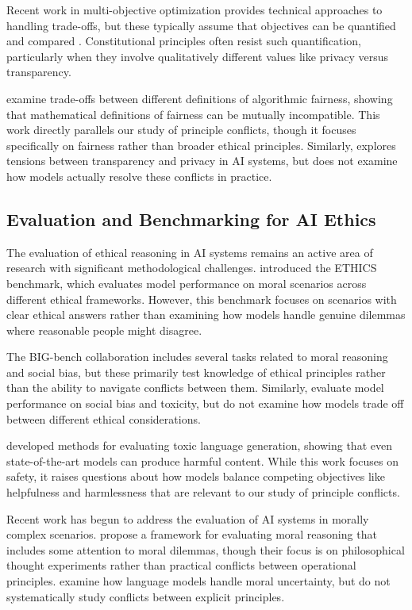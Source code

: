 \documentclass[11pt,a4paper]{article}
\begin{document}
Recent work in multi-objective optimization provides technical approaches to handling trade-offs, but these typically assume that objectives can be quantified and compared \citep{deb2001multi, zhang2007moea}. Constitutional principles often resist such quantification, particularly when they involve qualitatively different values like privacy versus transparency.

\citet{barocas2017fairness} examine trade-offs between different definitions of algorithmic fairness, showing that mathematical definitions of fairness can be mutually incompatible. This work directly parallels our study of principle conflicts, though it focuses specifically on fairness rather than broader ethical principles. Similarly, \citet{mitchell2021algorithmic} explores tensions between transparency and privacy in AI systems, but does not examine how models actually resolve these conflicts in practice.

\subsection{Evaluation and Benchmarking for AI Ethics}

The evaluation of ethical reasoning in AI systems remains an active area of research with significant methodological challenges. \citet{hendrycks2020measuring} introduced the ETHICS benchmark, which evaluates model performance on moral scenarios across different ethical frameworks. However, this benchmark focuses on scenarios with clear ethical answers rather than examining how models handle genuine dilemmas where reasonable people might disagree.

The BIG-bench collaboration \citep{srivastava2022beyond} includes several tasks related to moral reasoning and social bias, but these primarily test knowledge of ethical principles rather than the ability to navigate conflicts between them. Similarly, \citet{rae2021scaling} evaluate model performance on social bias and toxicity, but do not examine how models trade off between different ethical considerations.

\citet{gehman2020realtoxicityprompts} developed methods for evaluating toxic language generation, showing that even state-of-the-art models can produce harmful content. While this work focuses on safety, it raises questions about how models balance competing objectives like helpfulness and harmlessness that are relevant to our study of principle conflicts.

Recent work has begun to address the evaluation of AI systems in morally complex scenarios. \citet{jin2022moral} propose a framework for evaluating moral reasoning that includes some attention to moral dilemmas, though their focus is on philosophical thought experiments rather than practical conflicts between operational principles. \citet{emelin2021moral} examine how language models handle moral uncertainty, but do not systematically study conflicts between explicit principles.
\end{document}

